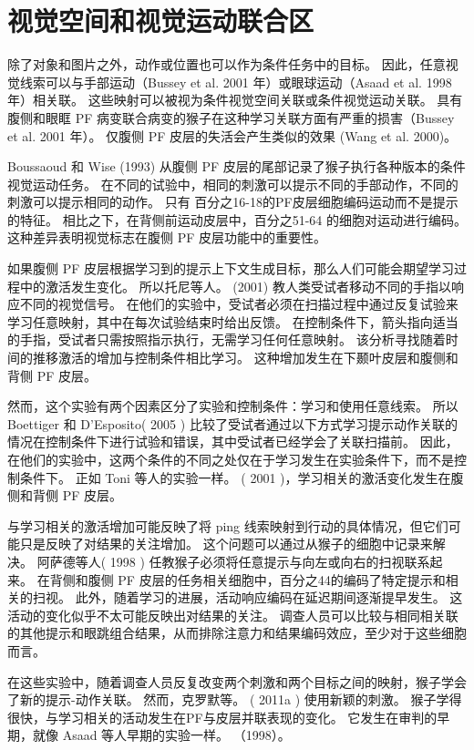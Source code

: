 \section{视觉空间和视觉运动联合区}
\par
除了对象和图片之外，动作或位置也可以作为条件任务中的目标。 
因此，任意视觉线索可以与手部运动（Bussey et al. 2001 年）或眼球运动（Asaad et al. 1998 年）相关联。 
这些映射可以被视为条件视觉空间关联或条件视觉运动关联。 
具有腹侧和眼眶 PF 病变联合病变的猴子在这种学习关联方面有严重的损害（Bussey et al. 2001 年）。 
仅腹侧 PF 皮层的失活会产生类似的效果 (Wang et al. 2000)。
\par
Boussaoud 和 Wise (1993) 从腹侧 PF 皮层的尾部记录了猴子执行各种版本的条件视觉运动任务。 
在不同的试验中，相同的刺激可以提示不同的手部动作，不同的刺激可以提示相同的动作。 
只有 百分之16-18的PF皮层细胞编码运动而不是提示的特征。
相比之下，在背侧前运动皮层中，百分之51-64 的细胞对运动进行编码。 
这种差异表明视觉标志在腹侧 PF 皮层功能中的重要性。
\par
如果腹侧 PF 皮层根据学习到的提示上下文生成目标，那么人们可能会期望学习过程中的激活发生变化。 
所以托尼等人。 (2001) 教人类受试者移动不同的手指以响应不同的视觉信号。 
在他们的实验中，受试者必须在扫描过程中通过反复试验来学习任意映射，其中在每次试验结束时给出反馈。 
在控制条件下，箭头指向适当的手指，受试者只需按照指示执行，无需学习任何任意映射。 
该分析寻找随着时间的推移激活的增加与控制条件相比学习。 
这种增加发生在下颞叶皮层和腹侧和背侧 PF 皮层。
\par
然而，这个实验有两个因素区分了实验和控制条件：学习和使用任意线索。 
所以 Boettiger 和 D’Esposito( 2005 ) 比较了受试者通过以下方式学习提示动作关联的情况在控制条件下进行试验和错误，其中受试者已经学会了关联扫描前。 
因此，在他们的实验中，这两个条件的不同之处仅在于学习发生在实验条件下，而不是控制条件下。 
正如 Toni 等人的实验一样。 ( 2001 )，学习相关的激活变化发生在腹侧和背侧 PF 皮层。
\par
与学习相关的激活增加可能反映了将 ping 线索映射到行动的具体情况，但它们可能只是反映了对结果的关注增加。
这个问题可以通过从猴子的细胞中记录来解决。 阿萨德等人( 1998 ) 任教猴子必须将任意提示与向左或向右的扫视联系起来。 
在背侧和腹侧 PF 皮层的任务相关细胞中，百分之44的编码了特定提示和相关的扫视。 
此外，随着学习的进展，活动响应编码在延迟期间逐渐提早发生。 这活动的变化似乎不太可能反映出对结果的关注。 
调查人员可以比较与相同相关联的其他提示和眼跳组合结果，从而排除注意力和结果编码效应，至少对于这些细胞而言。
\par
在这些实验中，随着调查人员反复改变两个刺激和两个目标之间的映射，猴子学会了新的提示-动作关联。 
然而，克罗默等。 ( 2011a ) 使用新颖的刺激。 猴子学得很快，与学习相关的活动发生在PF与皮层并联表现的变化。 
它发生在审判的早期，就像 Asaad 等人早期的实验一样。 （1998）。

